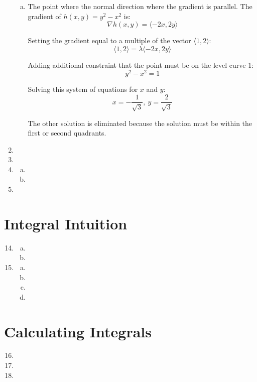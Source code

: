 \documentclass{article}
\begin{document}
\begin{enumerate}[1.]
\begin{enumerate}[a.]
      \item The point where the normal direction where the gradient is parallel.
        The gradient of $h(x,y) = y^{2} - x^{2}$ is:
        $$ \nabla h(x, y) = \langle -2x, 2y \rangle $$

        Setting the gradient equal to a multiple of the vector $\langle 1, 2 \rangle$:
        $$ \langle 1, 2 \rangle = \lambda \langle -2x, 2y \rangle $$

        Adding additional constraint that the point must be on the level curve
        1:
        $$ y^{2} - x^{2} = 1 $$

        Solving this system of equations for $x$ and $y$:
        $$ x = -\frac{ 1 }{ \sqrt{3} },\ y = \frac{ 2 }{ \sqrt{3} } $$

        The other solution is eliminated because the solution must be within the
        first or second quadrants.
    \end{enumerate}
  \item
  \item
  \item \begin{enumerate}[a.]
      \item
      \item
    \end{enumerate}
  \item
\end{enumerate}

\section{Integral Intuition}

\begin{enumerate}[1.]
  \setcounter{enumi}{13}
  \item \begin{enumerate}[a.]
      \item
      \item
    \end{enumerate}
  \item \begin{enumerate}[a.]
      \item
      \item
      \item
      \item
    \end{enumerate}
\end{enumerate}

\section{Calculating Integrals}

\begin{enumerate}[1.]
  \setcounter{enumi}{15}
  \item
  \item
  \item
\end{enumerate}
\end{document}
